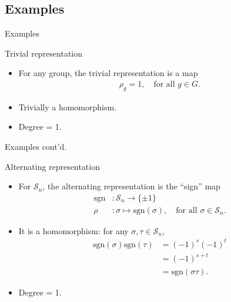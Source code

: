 \documentclass[handout, 10pt]{beamer}
\newcommand{\Sym}{\mathcal{S}}
\newcommand{\sgn}{\text{sgn}}
\begin{document}
	\subsection{Examples}
	\begin{frame}{Examples}
		\begin{block}{Trivial representation}
			\begin{itemize}
				\item For any group, the trivial representation is a map
				\begin{align*}
					\rho_g = 1, \quad \text{for all $g \in G$.}
				\end{align*}
				
				\item Trivially a homomorphism.
				
				\item Degree = 1.
			\end{itemize}
			
		\end{block}
	\end{frame}
	\begin{frame}{Examples cont'd.}
		\begin{block}{Alternating representation}
			\begin{itemize}
				\item For $\Sym_n$, the alternating representation is the ``sign'' map
				\begin{align*}
						\sgn &: \Sym_n \rightarrow \{\pm 1\} \\
					\rho &: \sigma \mapsto \sgn(\sigma), \quad \text{for all } \sigma \in \Sym_n.
				\end{align*}
				
				\item It is a homomorphism: for any $\sigma, \tau \in \Sym_n$,
				\begin{align*}
					\sgn(\sigma)\sgn(\tau) &= (-1)^s(-1)^t \\
					&= (-1)^{s+t} \\
					&= \sgn(\sigma\tau).
				\end{align*}
				
				\item Degree = 1.
			\end{itemize}
		\end{block}
	\end{frame}
	
\end{document}
